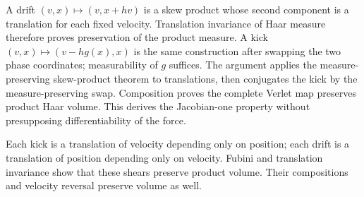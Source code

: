 \documentclass[11pt,a4paper]{article}
\begin{document}
A drift \((v,x)\mapsto(v,x+hv)\) is a skew product whose second component is a translation for each fixed velocity. Translation invariance of Haar measure therefore proves preservation of the product measure. A kick \((v,x)\mapsto(v-hg(x),x)\) is the same construction after swapping the two phase coordinates; measurability of \(g\) suffices. The argument applies the measure-preserving skew-product theorem to translations, then conjugates the kick by the measure-preserving swap. Composition proves the complete Verlet map preserves product Haar volume. This derives the Jacobian-one property without presupposing differentiability of the force.



Each kick is a translation of velocity depending only on position; each drift is a translation of position depending only on velocity. Fubini and translation invariance show that these shears preserve product volume. Their compositions and velocity reversal preserve volume as well.
\end{document}

